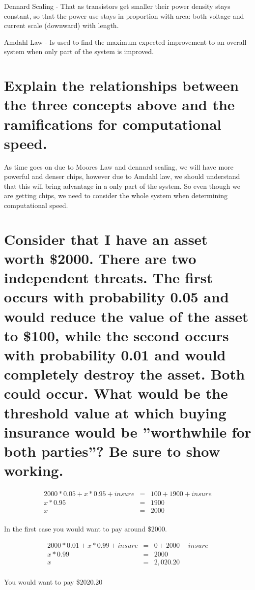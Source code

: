 \documentclass{article}
\begin{document}
Dennard Scaling - That as transistors get smaller their power density stays constant, so that the power use stays in proportion with area: both voltage and current scale (downward) with length. \cite{dennard}

Amdahl Law - Is used to find the maximum expected improvement to an overall system when only part of the system is improved. \cite{amdahl}

\section[Computational Speed]{Explain the relationships between the three concepts above and the ramifications for computational
speed.}

As time goes on due to Moores Law and dennard scaling, we will have more powerful and denser chips, however due to Amdahl law, we should understand that this will bring advantage in a only part of the system. So even though we are getting chips, we need to consider the whole system when determining computational speed. 

\section[Asset]{Consider that I have an asset worth \$2000. There are two independent threats. The first occurs with probability 0.05 and would reduce the value of the asset to \$100, while the second occurs with probability 0.01 and would completely destroy the asset. Both could occur. What would be the threshold value at which buying insurance would be ”worthwhile for both parties”? Be sure to show working. }

\begin{eqnarray*}
2000*0.05 + x*0.95 + insure &=& 100 + 1900 + insure \\
x*0.95 &=& 1900 \\
x &=& 2000 \\
\end{eqnarray*}

In the first case you would want to pay around \$2000.

\begin{eqnarray*}
2000*0.01 + x*0.99 + insure &=& 0 + 2000 + insure \\
x*0.99 &=& 2000 \\
x &=& 2,020.20 \\
\end{eqnarray*}

You would want to pay \$2020.20
\end{document}
